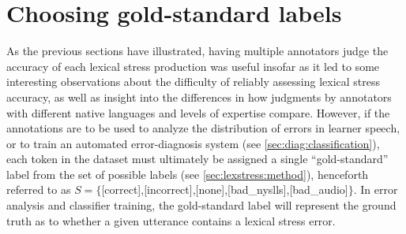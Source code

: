 %				
			
			
			
		\section{Choosing gold-standard labels}
		\label{sec:agreement:gold}
		
		
		
		As the previous sections have illustrated, having multiple annotators judge the accuracy of each lexical stress production was useful insofar as it led to some interesting observations about the difficulty of reliably assessing lexical stress accuracy, as well as insight into the differences in how judgments by annotators with different native languages and levels of expertise compare. However, if the annotations are to be used to analyze the distribution of errors in learner speech, or to train an automated error-diagnosis system (see \cref{sec:diag:classification}), each token in the dataset must ultimately be assigned a single ``gold-standard'' label from the set of possible labels (see \cref{sec:lexstress:method}), henceforth referred to as $S = \{$[correct],{[incorrect]},{[none]},{[bad\_nyslls]},{[bad\_audio]}$\}$.
		 In error analysis and classifier training, the gold-standard label will represent the ground truth as to whether a given utterance contains a lexical stress error.
		
